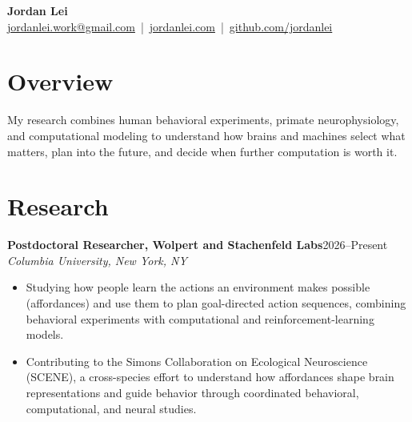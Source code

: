 \documentclass[10pt]{article}
\newcommand{\cvrole}[3]{%
  \textbf{#1}\hfill #3\\[-0.15em]
  \textit{#2}\par
}
\begin{document}
\begin{center}
    {\Huge \textbf{Jordan Lei}} \\
    \href{mailto:jordanlei.work@gmail.com}{jordanlei.work@gmail.com} \,|\,
    \href{https://jordanlei.com}{jordanlei.com} \,|\, \href{https://github.com/jordanlei}{github.com/jordanlei} \\
\end{center}

\section{Overview}
My research combines human behavioral experiments, primate neurophysiology, and computational modeling to understand how brains and machines select what matters, plan into the future, and decide when further computation is worth it.

\section{Research}
\cvrole{Postdoctoral Researcher, Wolpert and Stachenfeld Labs}{Columbia University, New York, NY}{2026--Present}
\begin{itemize}
    \item Studying how people learn the actions an environment makes possible (affordances) and use them to plan goal-directed action sequences, combining behavioral experiments with computational and reinforcement-learning models.
    \item Contributing to the Simons Collaboration on Ecological Neuroscience (SCENE), a cross-species effort to understand how affordances shape brain representations and guide behavior through coordinated behavioral, computational, and neural studies.
\end{itemize}
\end{document}
